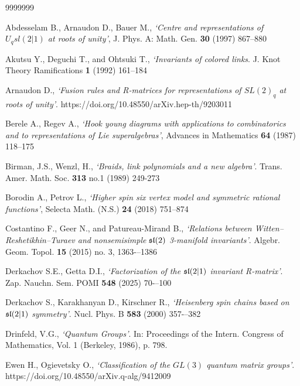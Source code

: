 \documentclass[11pt]{article}
\begin{document}
\bigskip\bigskip
\begin{thebibliography}{9999999}\label{refer}
	
\bigskip

Abdesselam B., Arnaudon D., Bauer M., {\em `Centre and representations of $U_qsl(2|1)$ at roots of unity'},
J. Phys. A: Math. Gen. {\bf 30} (1997) 867--880

  Akutsu Y.,  Deguchi T., and  Ohtsuki T., {\em`Invariants of colored links}. J. Knot Theory Ramifications
{\bf 1} (1992) 161–184

 Arnaudon D., {\em `Fusion rules and R-matrices for representations of $SL(2)_q$ at roots of unity'}.  	
https://doi.org/10.48550/arXiv.hep-th/9203011

Berele A., Regev A., {\em `Hook young diagrams with applications to combinatorics and to representations of Lie superalgebras'},
Advances in Mathematics {\bf 64} (1987) 118--175

 Birman, J.S., Wenzl, H., {\em `Braids, link polynomials and a new algebra'}. Trans.
Amer. Math. Soc. {\bf 313} no.1 (1989) 249-273

Borodin A., Petrov L., {\em `Higher spin six vertex model and symmetric rational functions'},
Selecta Math. (N.S.) {\bf 24} (2018) 751--874


 Costantino F.,  Geer N., and  Patureau-Mirand B., {\em `Relations between Witten–Reshetikhin–Turaev and nonsemisimple $\frak{sl}(2)$ 3-manifold invariants'}. Algebr. Geom. Topol. {\bf 15} (2015) no. 3, 1363-–1386

  Derkachov S.E.,  Getta D.I., {\em `Factorization of the $\frak{sl}(2|1)$ invariant R-matrix'}.  Zap. Nauchn. Sem. POMI {\bf 548}  (2025) 70-–100

  Derkachov S.,  Karakhanyan D.,  Kirschner R., {\em `Heisenberg spin chains based on
$\frak{sl}(2|1)$ symmetry'}. Nucl. Phys. B {\bf 583}  (2000) 357-–382

Drinfeld, V.G., {\em `Quantum Groups'}. In: Proceedings of the Intern. Congress of Mathematics, Vol.
1 (Berkeley, 1986), p. 798.
	
 Ewen H.,   Ogievetsky O., {\em `Classification of the $GL(3)$ quantum matrix groups'}.
 https://doi.org/10.48550/arXiv.q-alg/9412009


\end{thebibliography}
\end{document}
